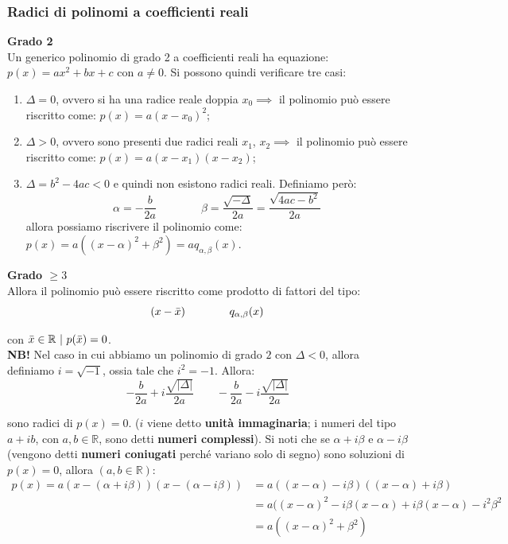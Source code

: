 \documentclass{article}
\begin{document}
\subsubsection{Radici di polinomi a coefficienti reali}
\textbf{Grado 2}\\
\noindent Un generico polinomio di grado 2 a coefficienti reali ha equazione: $p(x) = ax^2 + bx + c$ con $a \neq 0$. Si possono quindi verificare tre casi:
\begin{enumerate}
    \item $\Delta = 0$, ovvero si ha una radice reale doppia $x_0 \implies$ il polinomio può essere riscritto come: $p(x) = a(x - x_0)^2$;
    \item $\Delta > 0$, ovvero sono presenti due radici reali $x_1$, $x_2 \implies$ il polinomio può essere riscritto come: $p(x) = a(x - x_1)(x - x_2)$;
    \item $\Delta = b^2 - 4ac < 0$ e quindi non esistono radici reali. Definiamo però: $$\alpha = - \frac{b}{2a} \qquad \qquad \beta = \frac{\sqrt{-\Delta}}{2a} = \frac{\sqrt{4ac - b^2}}{2a}$$ allora possiamo riscrivere il polinomio come: $p(x) = a((x - \alpha)^2 + \beta^2) = aq_{\alpha, \beta}(x)$.
\end{enumerate}

\noindent\textbf{Grado $\geq 3$}\\
Allora il polinomio può essere riscritto come prodotto di fattori del tipo:
\begin{equation*}
    (x - \Bar{x}) \qquad \qquad q_{\alpha, \beta}(x)
\end{equation*}

\noindent con $\Bar{x} \in \mathbb{R} \ | \ p(\Bar{x}) = 0$.\\

\noindent\textbf{NB!} Nel caso in cui abbiamo un polinomio di grado $2$ con $\Delta < 0$, allora definiamo $i = \sqrt{-1}$, ossia tale che $i^2 = -1$. Allora:
\begin{equation*}
    - \frac{b}{2a} + i \frac{\sqrt{|\Delta|}}{2a} \qquad - \frac{b}{2a} - i \frac{\sqrt{|\Delta|}}{2a}
\end{equation*}

\noindent sono radici di $p(x) = 0$. ($i$ viene detto \textbf{unità immaginaria}; i numeri del tipo $a + ib$, con $a, b \in \mathbb{R}$, sono detti \textbf{numeri complessi}). Si noti che se $\alpha + i\beta$ e $\alpha - i\beta$ (vengono detti \textbf{numeri coniugati} perché variano solo di segno) sono soluzioni di $p(x) = 0$, allora $(a, b \in \mathbb{R})$:
\begin{align*}
    p(x) = a(x - (\alpha + i\beta))(x - (\alpha - i\beta)) &= a((x - \alpha) - i\beta)((x - \alpha) + i\beta) \\
    &= a((x - \alpha)^2 - i\beta(x - \alpha) + i\beta(x - \alpha) - i^2\beta^2 \\
    &= a((x - \alpha)^2 + \beta^2)
\end{align*}
\end{document}
